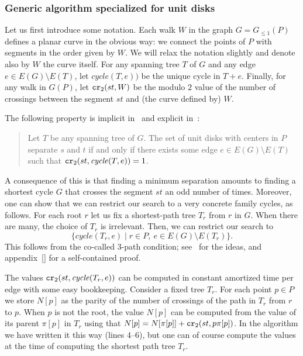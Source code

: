 \documentclass[a4paper,USenglish,numberwithinsect]{lipics}
\newcommand{\GG}{\ensuremath{G_{\le 1}}}
\newcommand{\cycle}{\mathit{cycle}}
\newcommand\CR{\mbox{\tt cr}_2}		  %
\let\le\leqslant
\begin{document}
\subsubsection{Generic algorithm specialized for unit disks}
\label{sec:generic}
Let us first introduce some notation.
Each walk $W$ in the graph $G=\GG(P)$ defines a planar curve
in the obvious way: we connect the points of $P$ 
with segments in the order given by $W$. 
We will relax the notation slightly and denote also by $W$ the curve itself.
For any spanning tree $T$ of $G$ and any edge $e\in E(G)\setminus E(T)$, 
let $\cycle(T,e))$ be the unique cycle in $T+e$.
Finally, for any walk in $G(P)$, let $\CR (st,W)$ be the 
modulo $2$ value of the number of crossings between the segment $st$ 
and (the curve defined by) $W$.

The following property is implicit in~\cite{CG16} and explicit in~\cite{CK15}:
\begin{quote}
	Let $T$ be any spanning tree of $G$.
	The set of unit disks with centers in $P$ separate $s$ and $t$ if and only
	if there exists some edge $e\in E(G)\setminus E(T)$ 
	such that $\CR (st, \cycle(T,e))=1$.
\end{quote}

A consequence of this is that finding a minimum separation amounts 
to finding a shortest cycle $G$ that crosses the segment $st$ an odd number of times.
Moreover, one can show that we can restrict our search to 
a very concrete family cycles, as follows. 
For each root $r$ let us fix a shortest-path tree $T_r$ from $r$ in $G$.
When there are many, the choice of $T_r$ is irrelevant. 
Then, we can restrict our search to
\[
	\{ \cycle(T_r,e)\mid r\in P,~ e\in E(G)\setminus E(T_r)\}.
\]
This follows from the co-called 3-path condition; 
see~\cite{CG16} for the ideas, and  appendix~\ref{} 
for a self-contained proof.

The values $\CR (st, \cycle(T_r,e))$ can be computed in constant amortized time per edge
with some easy bookkeeping. Consider a fixed tree $T_r$.
For each point $p\in P$ we store $N[p]$ as the parity of the number of crossings
of the path in $T_r$ from $r$ to $p$. When $p$ is not the root,
the value $N[p]$ can be computed from the value of its parent $\pi[p]$ in $T_r$
using that $N[p]=N[\pi[p]]+\CR(st,p\pi[p])$.
In the algorithm we have written it this way (lines 4--6), but
one can of course compute the values at the time of computing the shortest path tree $T_r$.
\end{document}
